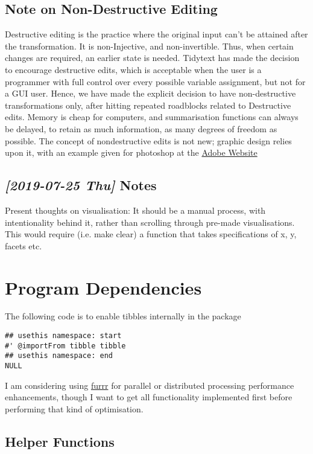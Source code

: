 \documentclass[a4paper, 11pt]{article}
\begin{document}
\subsection{Note on Non-Destructive Editing}
\label{sec:org0267a65}
Destructive editing is the practice where the original input can't be
attained after the transformation. It is non-Injective, and
non-invertible. Thus, when certain changes are required, an earlier
state is needed. Tidytext has made the decision to encourage
destructive edits, which is acceptable when the user is a programmer
with full control over every possible variable assignment, but not for
a GUI user. Hence, we have made the explicit decision to have
non-destructive transformations only, after hitting repeated
roadblocks related to Destructive edits. Memory is cheap for
computers, and summarisation functions can always be delayed, to
retain as much information, as many degrees of freedom as possible.
The concept of nondestructive edits is not new; graphic design relies
upon it, with an example given for photoshop at the \href{https://helpx.adobe.com/photoshop/using/nondestructive-editing.html}{Adobe Website}
\subsection{\textit{[2019-07-25 Thu] } Notes}
\label{sec:org6df9704}
Present thoughts on visualisation: It should be a manual process, with
intentionality behind it, rather than scrolling through pre-made
visualisations. This would require (i.e. make clear) a function that
takes specifications of x, y, facets etc.
\section{Program Dependencies}
\label{sec:org448a2e8}
The following code is to enable tibbles internally in the package
\begin{verbatim}
## usethis namespace: start
#' @importFrom tibble tibble
## usethis namespace: end
NULL
\end{verbatim}

I am considering using \href{https://davisvaughan.github.io/furrr/}{furrr} for parallel or distributed processing
performance enhancements, though I want to get all functionality
implemented first before performing that kind of optimisation.
\subsection{Helper Functions}
\label{sec:orgaf87a9c}
\end{document}
